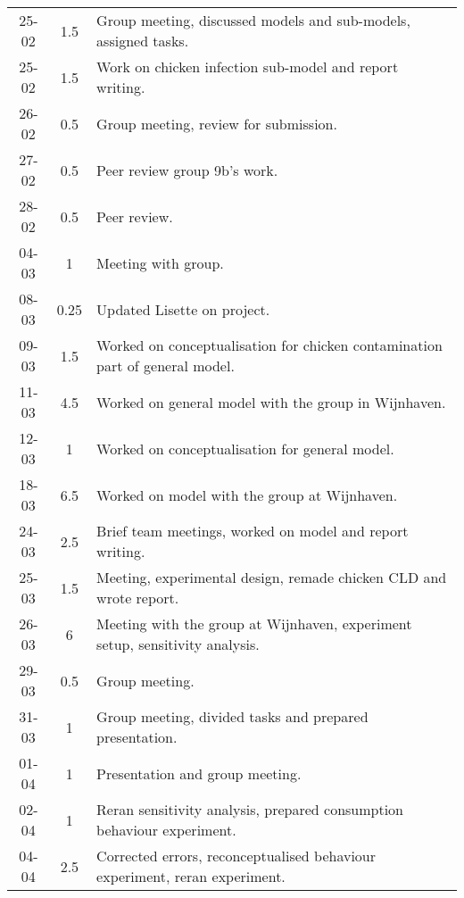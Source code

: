 \begin{longtable}[c]{c|c|m{35em}}
25-02   &   1.5     &   Group meeting, discussed models and sub-models, assigned tasks.              \\
25-02   &   1.5     &   Work on chicken infection sub-model and report writing.                      \\
26-02   &   0.5     &   Group meeting, review for submission.                                        \\
27-02   &   0.5     &   Peer review group 9b's work.                                                 \\
28-02   &   0.5     &   Peer review.                                                                 \\
04-03   &   1       &   Meeting with group.                                                          \\
08-03   &   0.25    &   Updated Lisette on project.                                                  \\
09-03   &   1.5     &   Worked on conceptualisation for chicken contamination part of general model. \\
11-03   &   4.5     &   Worked on general model with the group in Wijnhaven.                         \\
12-03   &   1       &   Worked on conceptualisation for general model.                               \\
18-03   &   6.5     &   Worked on model with the group at Wijnhaven.                                 \\
24-03   &   2.5     &   Brief team meetings, worked on model and report writing.                     \\
25-03   &   1.5     &   Meeting, experimental design, remade chicken CLD and wrote report.           \\
26-03   &   6       &   Meeting with the group at Wijnhaven, experiment setup, sensitivity analysis. \\
29-03   &   0.5     &   Group meeting.                                                               \\
31-03   &   1       &   Group meeting, divided tasks and prepared presentation.                      \\
01-04   &   1       &   Presentation and group meeting.                                              \\
02-04   &   1       &   Reran sensitivity analysis, prepared consumption behaviour experiment.        \\
04-04   &   2.5     &   Corrected errors, reconceptualised behaviour experiment, reran experiment.    \\

\end{longtable}
